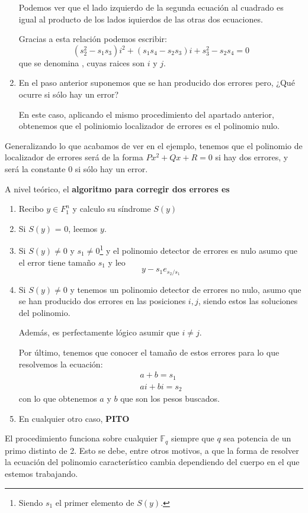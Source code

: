 \begin{example}
\begin{enumerate}
Podemos ver que el lado izquierdo de la segunda ecuación al cuadrado es igual al producto de los lados iquierdos de las otras dos ecuaciones.

Gracias a esta relación podemos escribir:
\[(s_2^2-s_1s_3)i^2+(s_1s_4-s_2s_3)i+s_3^2-s_2s_4=0\]
que se denomina , cuyas raices son $i$ y $j$.

\item En el paso anterior suponemos que se han producido dos errores pero, ¿Qué ocurre si sólo hay un error?

En este caso, aplicando el mismo procedimiento del apartado anterior, obtenemos que el poliniomio localizador de errores es el polinomio nulo.

\end{enumerate}
\end{example}

Generalizando lo que acabamos de ver en el ejemplo, tenemos que el polinomio de localizador de errores será de la forma $Px^2+Qx+R=0$ si hay dos errores, y será la constante $0$ si sólo hay un error.

A nivel teórico, el \textbf{algoritmo para corregir dos errores es}
\begin{enumerate}
\item Recibo $y\in F_1^n$ y calculo su síndrome $S(y)$
\item Si $S(y)$ = 0, leemos $y$.
\item Si $S(y) \neq 0$ y $s_1\neq 0$\footnote{Siendo $s_1$ el primer elemento de $S(y)$.} y el polinomio detector de errores es nulo asumo que el error tiene tamaño $s_1$ y leo
\[y-s_1e_{s_2/s_1}\]

\item Si $S(y) \neq 0$ y tenemos un polinomio detector de errores no nulo, asumo que se han producido dos errores en las posiciones $i,j$, siendo estos las soluciones del polinomio.

Además, es perfectamente lógico asumir que $i\neq j$.

Por último, tenemos que conocer el tamaño de estos errores para lo que resolvemos la ecuación:
\[\begin{array}{l}
a+b=s_1\\
ai+bi=s_2\end{array}\]
con lo que obtenemos $a$ y $b$ que son los pesos buscados.

\item En cualquier otro caso, \textbf{PITO}
\end{enumerate}

\obs El procedimiento funciona sobre cualquier $\mathbb{F}_q$ siempre que $q$ sea potencia de un primo distinto de 2. Esto se debe, entre otros motivos, a que la forma de resolver la ecuación del polinomio característico cambia dependiendo del cuerpo en el que estemos trabajando.